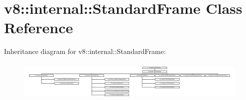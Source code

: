 \hypertarget{classv8_1_1internal_1_1StandardFrame}{}\section{v8\+:\+:internal\+:\+:Standard\+Frame Class Reference}
\label{classv8_1_1internal_1_1StandardFrame}
Inheritance diagram for v8\+:\+:internal\+:\+:Standard\+Frame\+:\begin{figure}[H]
\begin{center}
\leavevmode
\includegraphics[height=1.937716cm]{classv8_1_1internal_1_1StandardFrame}
\end{center}
\end{figure}
